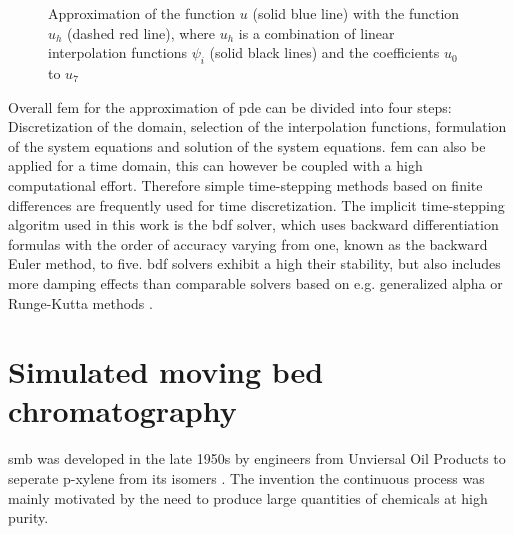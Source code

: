 \begin{figure}[H]
\centering
{}
\caption[]{Approximation of the function $u$ (solid blue line) with the function $u_{h}$ (dashed red line), where $u_{h}$ is a combination of linear interpolation functions $\psi_{i}$ (solid black lines) and the coefficients $u_{0}$ to $u_{7}$ \cite{ComsolFEM}
\label{fig:FEM}
}
\end{figure}

Overall \gls{fem} for the approximation of \gls{pde} can be divided into four steps: Discretization of the domain, selection of the interpolation functions, formulation of the system equations and solution of the system equations. \newline 
\Gls{fem} can also be applied for a time domain, this can however be coupled with a high computational effort. Therefore simple time-stepping methods based on finite differences are frequently used for time discretization. The implicit time-stepping algoritm used in this work is the \gls{bdf} solver, which uses backward differentiation formulas with the order of accuracy varying from one, known as the backward Euler method, to five. \Gls{bdf} solvers exhibit a high their stability, but also includes more damping effects than comparable solvers based on e.g. generalized alpha or Runge-Kutta methods \cite{ComsolRefManual}.  

\section{Simulated moving bed chromatography}
\label{sec:smb}
\gls{smb} was developed in the late 1950s by engineers from Unviersal Oil Products to seperate p-xylene from its isomers \cite{broughton1961continuous} \cite{carson1962rotary}. The invention the continuous process was mainly motivated by the need to produce large quantities of chemicals at high purity. 


